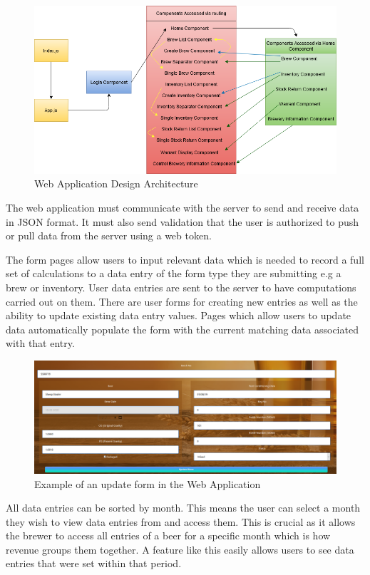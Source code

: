 \begin{figure}[h!]
 	\caption{Web Application Design Architecture}
	\label{image:webappdesign}
 	\centering
 	\includegraphics[width=1\textwidth]{Images/React Structure.png}
\end{figure}
The web application must communicate with the server to send and receive data in JSON format. It must also send validation that the user is authorized to push or pull data from the server using a web token. \par
The form pages allow users to input relevant data which is needed to record a full set of calculations to a data entry of the form type they are submitting e.g a brew or inventory. User data entries are sent to the server to have computations carried out on them. There are user forms for creating new entries as well as the ability to update existing data entry values. Pages which allow users to update data automatically populate the form with the current matching data associated with that entry.\par
\begin{figure}[h!]
 	\caption{Example of an update form in the Web Application}
	\label{image:form}
 	\centering
 	\includegraphics[width=1\textwidth]{Images/form.PNG}
\end{figure}
All data entries can be sorted by month. This means the user can select a month they wish to view data entries from and access them. This is crucial as it allows the brewer to access all entries of a beer for a specific month which is how revenue groups them together. A feature like this easily allows users to see data entries that were set within that period. \\
